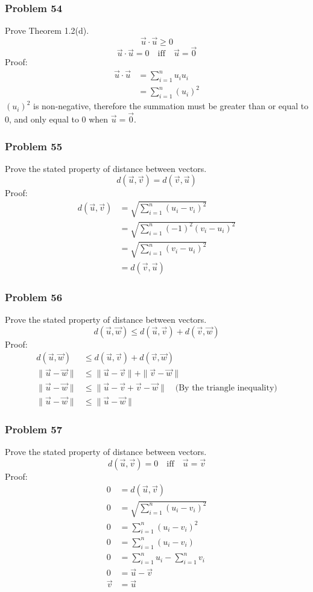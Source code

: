 \documentclass[letterpaper, 12pt]{math}
\begin{document}
\subsubsection*{Problem 54}
Prove Theorem 1.2(d).
\[ \vec{u}\cdot\vec{u} \ge 0 \]
\[ \vec{u}\cdot\vec{u} = 0 \quad\text{iff}\quad \vec{u} = \vec{0} \]
Proof:
\begin{align*}
  \vec{u}\cdot\vec{u} &= \sum_{i=1}^{n}u_iu_i \\
  &= \sum_{i=1}^{n}(u_i)^{2}
\end{align*}
\( (u_i)^{2} \) is non-negative, therefore the summation must be greater than
or equal to 0, and only equal to 0 when \( \vec{u} = \vec{0} \).

\subsubsection*{Problem 55}
Prove the stated property of distance between vectors.
\[ d(\vec{u},\vec{v}) = d(\vec{v},\vec{u}) \]
Proof:
\begin{align*}
  d(\vec{u},\vec{v}) &= \sqrt{\sum_{i=1}^{n}(u_i-v_i)^2} \\
  &= \sqrt{\sum_{i=1}^{n}(-1)^2(v_i-u_i)^2} \\
  &= \sqrt{\sum_{i=1}^{n}(v_i-u_i)^2} \\
  &= d(\vec{v},\vec{u})
\end{align*}

\subsubsection*{Problem 56}
Prove the stated property of distance between vectors.
\[ d(\vec{u},\vec{w}) \le d(\vec{u},\vec{v})+d(\vec{v},\vec{w}) \]
Proof:
\begin{align*}
  d(\vec{u},\vec{w}) &\le d(\vec{u},\vec{v})+d(\vec{v},\vec{w}) \\
  \|\vec{u}-\vec{w}\| &\le \|\vec{u}-\vec{v}\|+\|\vec{v}-\vec{w}\| \\
  \|\vec{u}-\vec{w}\| &\le \|\vec{u}-\vec{v}+\vec{v}-\vec{w}\|
    \quad\text{(By the triangle inequality)} \\
  \|\vec{u}-\vec{w}\| &\le \|\vec{u}-\vec{w}\|
\end{align*}

\subsubsection*{Problem 57}
Prove the stated property of distance between vectors.
\[ d(\vec{u},\vec{v}) = 0 \quad\text{iff}\quad \vec{u} = \vec{v} \]
Proof:
\begin{align*}
  0 &= d(\vec{u},\vec{v}) \\
  0 &= \sqrt{\sum_{i=1}^{n}(u_i-v_i)^2} \\
  0 &= \sum_{i=1}^{n}(u_i-v_i)^2 \\
  0 &= \sum_{i=1}^{n}(u_i-v_i) \\
  0 &= \sum_{i=1}^{n}u_i-\sum_{i=1}^{n}v_i \\
  0 &= \vec{u}-\vec{v} \\
  \vec{v} &= \vec{u}
\end{align*}
\end{document}
